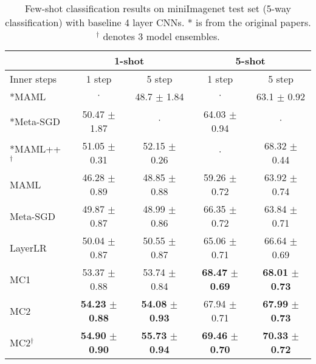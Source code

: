\documentclass{article}
\begin{document}
\begin{table}[t]
\caption{Few-shot classification results on miniImagenet test set (5-way classification) with baseline 4 layer CNNs. \mbox{*} is from the original papers. $^\dagger$ denotes 3 model ensembles.}
\vskip -0.1in
\label{table:miniimagenet}
\begin{center}
\begin{small}
\begin{tabular}{lcccc}
\toprule
& \multicolumn{2}{c}{1-shot} & \multicolumn{2}{c}{5-shot} \\
\midrule
Inner steps & 1 step & 5 step & 1 step & 5 step \\
\midrule
\mbox{*}MAML               & $\cdot$  & 48.7 $\pm$ 1.84    & $\cdot$   & 63.1 $\pm$ 0.92\\
\mbox{*}Meta-SGD           & 50.47 $\pm$ 1.87   & $\cdot$           & 64.03 $\pm$ 0.94 & $\cdot$  \\
\mbox{*}MAML++$^\dagger$  & 51.05 $\pm$ 0.31   & 52.15 $\pm$ 0.26   & $\cdot$           & 68.32 $\pm$ 0.44 \\
\midrule
MAML       & 46.28 $\pm$ 0.89   & 48.85 $\pm$ 0.88    & 59.26 $\pm$ 0.72  & 63.92 $\pm$ 0.74 \\
Meta-SGD   & 49.87 $\pm$ 0.87   & 48.99 $\pm$ 0.86    & 66.35 $\pm$ 0.72  & 63.84 $\pm$ 0.71 \\
LayerLR            & 50.04 $\pm$ 0.87   & 50.55 $\pm$ 0.87    & 65.06 $\pm$ 0.71  & 66.64 $\pm$ 0.69 \\
MC1                & 53.37 $\pm$ 0.88   & 53.74 $\pm$ 0.84    & \textbf{68.47} $\pm$ \textbf{0.69} & \textbf{68.01} $\pm$ \textbf{0.73} \\
MC2                & \textbf{54.23} $\pm$ \textbf{0.88}   & \textbf{54.08} $\pm$ \textbf{0.93} & 67.94 $\pm$ 0.71  & \textbf{67.99} $\pm$ \textbf{0.73} \\
MC2$^\dagger$     & \textbf{54.90} $\pm$ \textbf{0.90}   & \textbf{55.73} $\pm$ \textbf{0.94} & \textbf{69.46} $\pm$ \textbf{0.70}  & \textbf{70.33} $\pm$ \textbf{0.72} \\
\bottomrule
\end{tabular}
\end{small}
\end{center}
\vskip -0.1in
\end{table}
\end{document}
